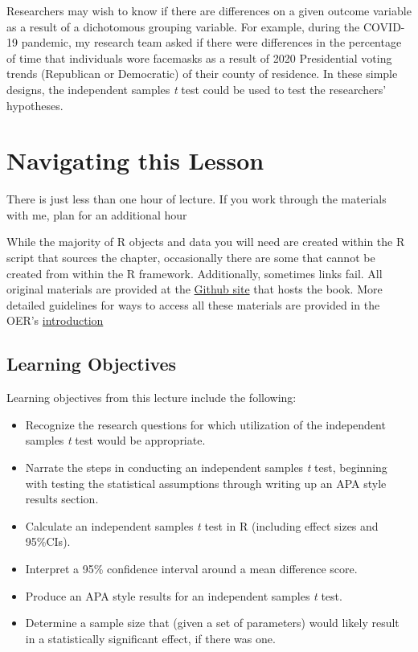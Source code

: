 \documentclass[
  11pt,
]{book}
\providecommand{\tightlist}{%
  \setlength{\itemsep}{0pt}\setlength{\parskip}{0pt}}
\begin{document}
Researchers may wish to know if there are differences on a given outcome variable as a result of a dichotomous grouping variable. For example, during the COVID-19 pandemic, my research team asked if there were differences in the percentage of time that individuals wore facemasks as a result of 2020 Presidential voting trends (Republican or Democratic) of their county of residence. In these simple designs, the independent samples \emph{t} test could be used to test the researchers' hypotheses.

\hypertarget{navigating-this-lesson-3}{%
\section{Navigating this Lesson}\label{navigating-this-lesson-3}}

There is just less than one hour of lecture. If you work through the materials with me, plan for an additional hour

While the majority of R objects and data you will need are created within the R script that sources the chapter, occasionally there are some that cannot be created from within the R framework. Additionally, sometimes links fail. All original materials are provided at the \href{https://github.com/lhbikos/ReCenterPsychStats}{Github site} that hosts the book. More detailed guidelines for ways to access all these materials are provided in the OER's \protect\hyperlink{ReCintro}{introduction}

\hypertarget{learning-objectives-3}{%
\subsection{Learning Objectives}\label{learning-objectives-3}}

Learning objectives from this lecture include the following:

\begin{itemize}
\tightlist
\item
  Recognize the research questions for which utilization of the independent samples \emph{t} test would be appropriate.
\item
  Narrate the steps in conducting an independent samples \emph{t} test, beginning with testing the statistical assumptions through writing up an APA style results section.
\item
  Calculate an independent samples \emph{t} test in R (including effect sizes and 95\%CIs).
\item
  Interpret a 95\% confidence interval around a mean difference score.
\item
  Produce an APA style results for an independent samples \emph{t} test.
\item
  Determine a sample size that (given a set of parameters) would likely result in a statistically significant effect, if there was one.
\end{itemize}
\end{document}
